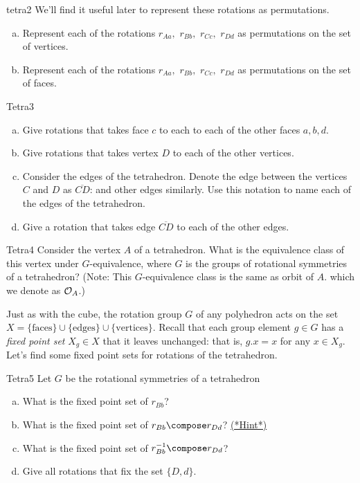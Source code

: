 \begin{exercise}{tetra2}
We'll find it useful later to represent these rotations as permutations.
\begin{enumerate}[(a)] 
\item Represent each of the rotations $r_{Aa},$ $r_{Bb},$ $r_{Cc},$ $r_{Dd}$ as permutations on the set of vertices.
\item Represent each of the rotations $r_{Aa},$ $r_{Bb},$ $r_{Cc},$ $r_{Dd}$ as permutations on the set of faces.
\end{enumerate}
\end {exercise}
\begin{exercise}{Tetra3}
\begin{enumerate}[(a)]
\item Give rotations that takes face $c$ to each to each of the other faces $a, b, d$.
\item Give rotations that takes vertex $D$ to each of the other vertices.
\item Consider the edges of the tetrahedron.  Denote the edge between the vertices $C$ and $D$ as $\overline{CD}$: and other edges similarly.  Use this notation to name each of the edges of the tetrahedron.
 \item Give a rotation that takes edge $\overline{CD}$ to each of the other edges.
\end{enumerate}
\end{exercise} 
\begin{exercise}{Tetra4}
Consider the vertex $A$ of a tetrahedron.  What is the equivalence class of this vertex under $G$-equivalence, where $G$ is the groups of rotational symmetries of a tetrahedron?   (Note:  This $G$-equivalence class is the same as orbit of $A$. which we denote as ${\cal O}_A$.)
\end {exercise}


Just as with the cube, the rotation group $G$ of any polyhedron acts on the set $X=\{\text{faces}\}\cup\{\text{edges}\}\cup\{\text{vertices}\}$. Recall that each group element $g\in G$ has a \emph{fixed point set} $X_g\in X$ that it leaves unchanged: that is, $g.x=x$ for any $x\in X_g$. Let's find some fixed point sets for rotations of the tetrahedron.

\begin{exercise}{Tetra5}
Let $G$ be the rotational symmetries of a tetrahedron
\begin{enumerate}[(a)]
\item  What is the fixed point set of $r_{Bb}$?
\item What is the fixed point set of $r_{Bb}\compose r_{Dd}$? 
\hyperref[sec:GroupActions:Hints]{(*Hint*)}
\item What is the fixed point set of $r_{Bb}^{-1}\compose r_{Dd}$?
\item Give all rotations that fix the set $\{D,d\}$. 
\end{enumerate}
\end {exercise}

